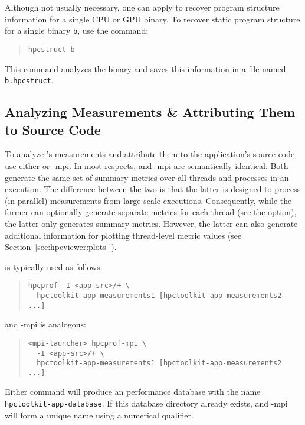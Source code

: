 \documentclass[11pt,twoside,letterpaper]{report}
\begin{document}
Although not usually necessary, one can apply \hpcstruct{}  to recover program structure information for a single CPU or GPU binary.
To recover static program structure for a single binary \texttt{b}, use the command:
\begin{quote}
  \verb|hpcstruct b|
\end{quote}
This command analyzes the binary and saves this information in a file named \texttt{b.hpcstruct}.



\subsection{Analyzing Measurements \& Attributing Them to Source Code}

To analyze \HPCToolkit{}'s measurements and attribute them to the application's source code, use either \hpcprof{} or \hpcprof-mpi{}.
In most respects, \hpcprof{} and \hpcprof-mpi{} are semantically identical.
Both generate the same set of summary metrics over all threads and processes in an execution.
The difference between the two is that the latter is designed to process (in parallel) measurements from large-scale executions.
Consequently, while the former can optionally generate separate metrics for each thread (see the  option), the latter only generates summary metrics.
However, the latter can also generate additional information for plotting thread-level metric values (see Section~\ref{sec:hpcviewer:plots}%
).

\hpcprof{} is typically used as follows:
\begin{quote}
\begin{verbatim}
hpcprof -I <app-src>/+ \
  hpctoolkit-app-measurements1 [hpctoolkit-app-measurements2 ...]
\end{verbatim}
\end{quote}
and \hpcprof-mpi{} is analogous:
\begin{quote}
\begin{verbatim}
<mpi-launcher> hpcprof-mpi \
  -I <app-src>/+ \
  hpctoolkit-app-measurements1 [hpctoolkit-app-measurements2 ...]
\end{verbatim}
\end{quote}
Either command will produce an \HPCToolkit{} performance database with the name \texttt{hpctoolkit-app-database}.
If this database directory already exists, \hpcprof{} and \hpcprof-mpi{} will form a unique name using a numerical qualifier.
\end{document}
